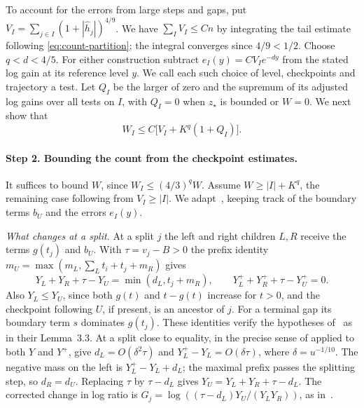 \documentclass[11pt]{article}
\theoremstyle{definition}
\begin{document}
To account for the errors from large steps and gaps, put
\(V_I=\sum_{j\in I}(1+|\hat h_j|)^{4/9}\). We have \(\sum_I V_I\le Cn\)
by integrating the tail estimate following \eqref{eq:count-partition};
the integral converges since \(4/9<1/2\). Choose \(q<d<4/5\).
For either construction subtract
\(e_I(y)=C V_I e^{-dy}\) from the stated log gain at its reference
level \(y\). We call each such choice of level, checkpoints and
trajectory a test. Let \(Q_I\) be the larger of zero and the supremum
of its adjusted log gains over all tests on \(I\), with \(Q_I=0\)
when \(z_\star\) is bounded or \(W=0\).
We next show that
\begin{equation}\label{eq:count-scalar}
 W_I\le C\bigl[V_I+K^q(1+Q_I)\bigr].
\end{equation}

\paragraph{Step 2. Bounding the count from the checkpoint estimates.}
It suffices to bound \(W\), since \(W_I\le(4/3)^qW\). Assume
\(W\ge |I|+K^q\), the remaining case following from \(V_I\ge|I|\).
We adapt~\cite[Proposition~7.3]{JH}, keeping track of the boundary
terms \(b_U\) and the errors \(e_I(y)\).

\emph{What changes at a split.} At a split \(j\) the left and right children \(L,R\) receive the terms
\(g(t_j)\) and \(b_U\). With \(\tau=v_j-B>0\) the prefix identity
\(m_U=\max(m_L,\sum_Lt_i+t_j+m_R)\) gives
\[
 Y_L+Y_R+\tau-Y_U=\min(d_L,t_j+m_R),\qquad
 Y_L^++Y_R^++\tau-Y_U^+=0.
\]
Also \(Y_L\le Y_U\), since both \(g(t)\) and \(t-g(t)\) increase for
\(t>0\), and the checkpoint following \(U\), if present, is an ancestor
of \(j\). For a terminal gap its boundary term \(s\) dominates \(g(t_j)\).
These identities verify the hypotheses of~\cite[Lemma~3.1]{JH} as in
their Lemma~3.3. At a split close to equality, in the precise sense of
\cite[Lemma~5.5]{JH} applied to both \(Y\) and \(Y^+\),
\cite[(5.15)--(5.16)]{JH} give
\(d_L=O(\delta^2\tau)\) and \(Y_L^+-Y_L=O(\delta\tau)\), where
\(\delta=u^{-1/10}\). The negative mass on the left is
\(Y_L^+-Y_L+d_L\); the maximal prefix passes the splitting step, so
\(d_R=d_U\). Replacing \(\tau\) by \(\tau-d_L\) gives
\(Y_U=Y_L+Y_R+\tau-d_L\). The corrected change in log ratio is
\(G_j=\log((\tau-d_L)Y_U/(Y_LY_R))\), as in~\cite[(5.27)--(5.31), (6.9)]{JH}.
\end{document}
